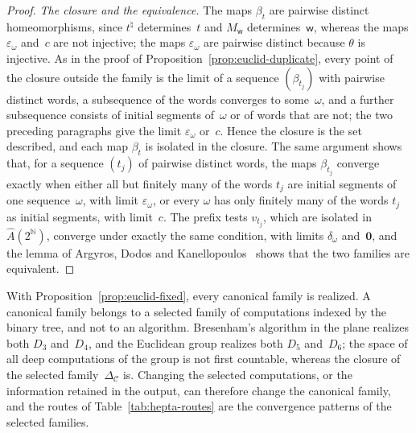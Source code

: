 \documentclass[psamsfonts]{amsart}
\theoremstyle{definition}
\theoremstyle{remark}
\numberwithin{equation}{section}
\begin{document}
\begin{proof}
  \emph{The closure and the equivalence.}
  The maps $\beta_t$ are pairwise distinct homeomorphisms, since $t^\natural$ determines~$t$ and $M_{\mathsf{w}}$ determines~$\mathsf{w}$, whereas the maps $\varepsilon_\omega$ and~$c$ are not injective; the maps $\varepsilon_\omega$ are pairwise distinct because $\theta$ is injective.
  As in the proof of Proposition~\ref{prop:euclid-duplicate}, every point of the closure outside the family is the limit of a sequence $(\beta_{t_j})$ with pairwise distinct words, a subsequence of the words converges to some~$\omega$, and a further subsequence consists of initial segments of~$\omega$ or of words that are not; the two preceding paragraphs give the limit $\varepsilon_\omega$ or~$c$.
  Hence the closure is the set described, and each map $\beta_t$ is isolated in the closure.
  The same argument shows that, for a sequence $(t_j)$ of pairwise distinct words, the maps $\beta_{t_j}$ converge exactly when either all but finitely many of the words $t_j$ are initial segments of one sequence~$\omega$, with limit $\varepsilon_\omega$, or every $\omega$ has only finitely many of the words $t_j$ as initial segments, with limit~$c$.
  The prefix tests $v_{t_j}$, which are isolated in $\hat A(2^{\mathbb{N}})$, converge under exactly the same condition, with limits $\delta_\omega$ and~$\mathbf{0}$, and the lemma of Argyros, Dodos and Kanellopoulos~\cite[Lemma~19]{argyros2008rosenthal} shows that the two families are equivalent.
\end{proof}

With Proposition~\ref{prop:euclid-fixed}, every canonical family is realized.
A canonical family belongs to a selected family of computations indexed by the binary tree, and not to an algorithm.
Bresenham's algorithm in the plane realizes both $D_3$ and~$D_4$, and the Euclidean group realizes both $D_5$ and~$D_6$; the space of all deep computations of the group is not first countable, whereas the closure of the selected family~$\Delta_{\mathcal{C}}$ is.
Changing the selected computations, or the information retained in the output, can therefore change the canonical family, and the routes of Table~\ref{tab:hepta-routes} are the convergence patterns of the selected families.
\end{document}
